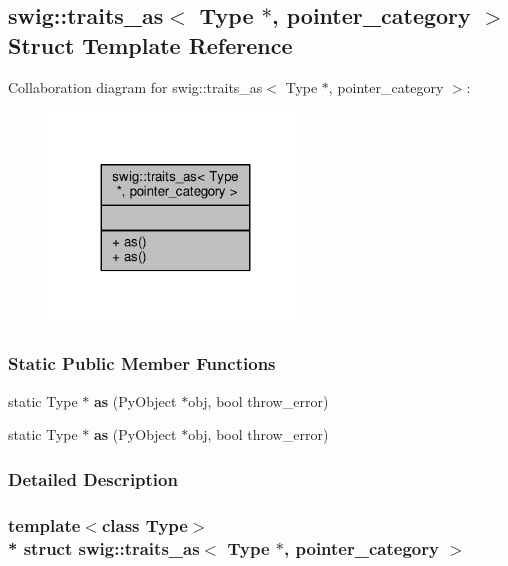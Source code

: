 \subsection{swig\+:\+:traits\+\_\+as$<$ Type $\ast$, pointer\+\_\+category $>$ Struct Template Reference}
\label{structswig_1_1traits__as_3_01Type_01_5_00_01pointer__category_01_4}


Collaboration diagram for swig\+:\+:traits\+\_\+as$<$ Type $\ast$, pointer\+\_\+category $>$\+:
\nopagebreak
\begin{figure}[H]
\begin{center}
\leavevmode
\includegraphics[width=191pt]{d2/df2/structswig_1_1traits__as_3_01Type_01_5_00_01pointer__category_01_4__coll__graph}
\end{center}
\end{figure}
\subsubsection*{Static Public Member Functions}
\begin{DoxyCompactItemize}
\item 
static Type $\ast$ {\bf as} (Py\+Object $\ast$obj, bool throw\+\_\+error)
\item 
static Type $\ast$ {\bf as} (Py\+Object $\ast$obj, bool throw\+\_\+error)
\end{DoxyCompactItemize}


\subsubsection{Detailed Description}
\subsubsection*{template$<$class Type$>$\\*
struct swig\+::traits\+\_\+as$<$ Type $\ast$, pointer\+\_\+category $>$}



